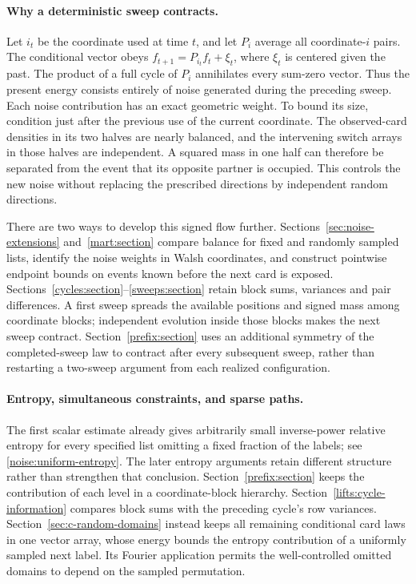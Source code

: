 \paragraph{Why a deterministic sweep contracts.}
Let $i_t$ be the coordinate used at time $t$, and let $P_i$ average
all coordinate-$i$ pairs. The conditional vector obeys
$f_{t+1}=P_{i_t}f_t+\xi_t$, where $\xi_t$ is centered given the
past. The product of a full cycle of $P_i$ annihilates every sum-zero
vector. Thus the present energy consists entirely of noise generated
during the preceding sweep. Each noise contribution has an exact
geometric weight. To bound its size, condition just after the previous
use of the current coordinate. The observed-card densities in its
two halves are nearly balanced, and the intervening switch arrays
in those halves are independent. A squared mass in one half can
therefore be separated from the event that its opposite partner is
occupied. This controls the new noise without replacing the
prescribed directions by independent random directions.

There are two ways to develop this signed flow further.
Sections~\ref{sec:noise-extensions} and~\ref{mart:section} compare
balance for fixed and randomly sampled lists, identify the noise
weights in Walsh coordinates, and construct pointwise endpoint bounds
on events known before the next card is exposed.
Sections~\ref{cycles:section}--\ref{sweeps:section} retain block sums,
variances and pair differences. A first sweep spreads the available
positions and signed mass among coordinate blocks; independent
evolution inside those blocks makes the next sweep contract.
Section~\ref{prefix:section} uses an additional symmetry of the
completed-sweep law to contract after every subsequent sweep, rather
than restarting a two-sweep argument from each realized configuration.

\paragraph{Entropy, simultaneous constraints, and sparse paths.}
The first scalar estimate already gives arbitrarily small inverse-power
relative entropy for every specified list omitting a fixed fraction of
the labels; see \eqref{noise:uniform-entropy}. The later entropy arguments
retain different structure rather than strengthen that conclusion.
Section~\ref{prefix:section} keeps the contribution of each level in a
coordinate-block hierarchy. Section~\ref{lifts:cycle-information} compares
block sums with the preceding cycle's row variances.
Section~\ref{sec:c-random-domains} instead keeps all remaining conditional
card laws in one vector array, whose energy bounds the entropy contribution
of a uniformly sampled next label. Its Fourier application permits the
well-controlled omitted domains to depend on the sampled permutation.

